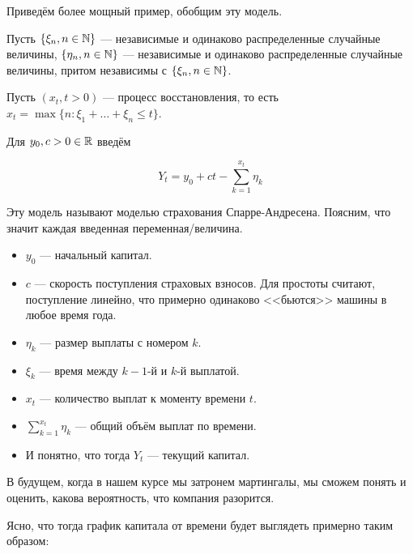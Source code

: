 Приведём более мощный пример, обобщим эту модель.

\begin{example}
  Пусть $\{\xi_n, n \in \mathbb{N}\}$ --- независимые и одинаково распределенные
  случайные величины, $\{\eta_n, n \in \mathbb{N}\}$ --- независимые и одинаково
  распределенные случайные величины, притом независимы с $\{\xi_n, n \in \mathbb{N}\}$.

  Пусть $(x_t, t > 0)$ --- процесс восстановления, то есть
  $x_t = \max\{n : \xi_1 + \ldots + \xi_n \leq t\}$.

  Для $y_0, c > 0 \in \mathbb{R}$ введём

  \[
    Y_t = y_0 + ct - \sum\limits_{k = 1}^{x_t} \eta_k
  \]

  Эту модель называют моделью страхования Спарре-Андресена. Поясним, что значит
  каждая введенная переменная/величина.

  \begin{itemize}
    \item $y_0$ --- начальный капитал.
    \item $c$ --- скорость поступления страховых взносов. Для простоты считают,
    поступление линейно, что примерно одинаково <<бьются>> машины в любое время
    года.
    \item $\eta_k$ --- размер выплаты с номером $k$.
    \item $\xi_k$ --- время между $k - 1$-й и $k$-й выплатой.
    \item $x_t$ --- количество выплат к моменту времени $t$.
    \item $\sum\limits_{k = 1}^{x_t} \eta_k$ --- общий объём выплат по времени.
    \item И понятно, что тогда $Y_t$ --- текущий капитал.
  \end{itemize}

  В будущем, когда в нашем курсе мы затронем мартингалы, мы сможем понять и
  оценить, какова вероятность, что компания разорится.

  Ясно, что тогда график капитала от времени будет выглядеть примерно 
  таким образом:


\begin{center}
\end{center}
\end{example}
